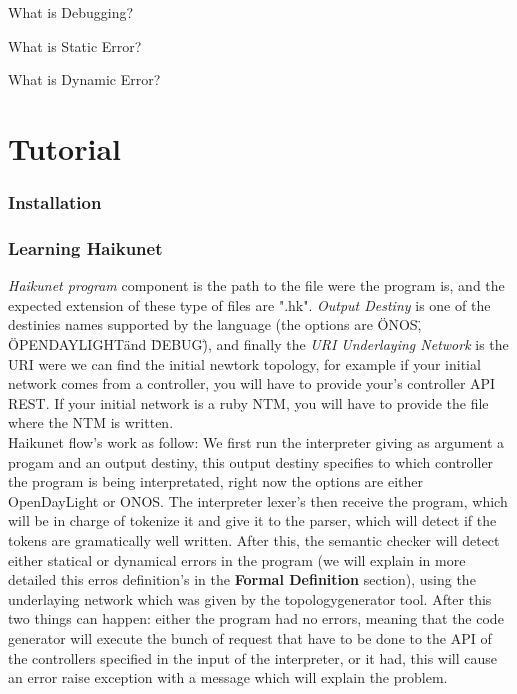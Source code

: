 What is Debugging?

What is Static Error?

What is Dynamic Error?

\section{Tutorial}

\subsubsection{Installation}

\subsubsection{Learning Haikunet}

\textit{Haikunet program} component is the path to the file were the program is, and the expected extension of these type of files are ".hk". \textit{Output Destiny} is one of the destinies names supported by the language (the options are \"ONOS\", \"OPENDAYLIGHT\" and \"DEBUG\"), and finally the \textit{URI Underlaying Network} is the URI were we can find the initial newtork topology, for example if your initial network comes from a controller, you will have to provide your's controller API REST. If your initial network is a ruby NTM, you will have to provide the file where the NTM is written.\\


Haikunet flow's work as follow: We first run the interpreter giving as argument a progam and an output destiny, this output destiny specifies to which controller the program is being interpretated, right now the options are either OpenDayLight or ONOS. The interpreter lexer's then receive the program, which will be in charge of tokenize it and give it to the parser, which will detect if the tokens are gramatically well written. After this, the semantic checker will detect either statical or dynamical errors in the program (we will explain in more detailed this erros definition's in the \textbf{Formal Definition} section), using the underlaying network which was given by the topologygenerator tool. After this two things can happen: either the program had no errors, meaning that the code generator will execute the bunch of request that have to be done to the API of the controllers specified in the input of the interpreter, or it had, this will cause an error raise exception with a message which will explain the problem. \\

